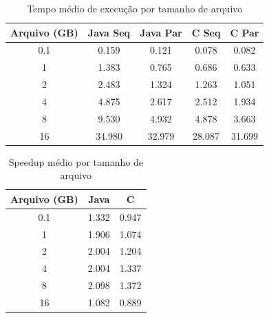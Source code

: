 
\begin{table}[H]
\centering
\caption{Tempo médio de execução por tamanho de arquivo}
\begin{tabular}{ccccc}
\toprule
Arquivo (GB) & Java Seq & Java Par & C Seq & C Par \\
\midrule
0.1 & 0.159 & 0.121 & 0.078 & 0.082 \\
1 & 1.383 & 0.765 & 0.686 & 0.633 \\
2 & 2.483 & 1.324 & 1.263 & 1.051 \\
4 & 4.875 & 2.617 & 2.512 & 1.934 \\
8 & 9.530 & 4.932 & 4.878 & 3.663 \\
16 & 34.980 & 32.979 & 28.087 & 31.699 \\
\bottomrule
\end{tabular}
\end{table}

\begin{table}[H]
\centering
\caption{Speedup médio por tamanho de arquivo}
\begin{tabular}{ccc}
\toprule
Arquivo (GB) & Java & C \\
\midrule
0.1 & 1.332 & 0.947 \\
1 & 1.906 & 1.074 \\
2 & 2.004 & 1.204 \\
4 & 2.004 & 1.337 \\
8 & 2.098 & 1.372 \\
16 & 1.082 & 0.889 \\
\bottomrule
\end{tabular}
\end{table}
